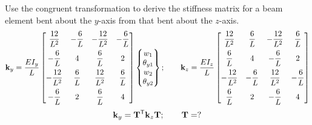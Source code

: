\begin{example}
Use the congruent transformation to derive the stiffness matrix for a beam element bent about the $y$-axis from that bent about the $z$-axis.
\begin{equation*}
  \mathbf{k}_y = \frac{EI_y}{L}
  \begin{bmatrix}
    \dfrac{12}{L^2} & -\dfrac6L & -\dfrac{12}{L^2} & -\dfrac6L\\[8pt]
    -\dfrac6L & 4 & \dfrac6L & 2\\[8pt]
    -\dfrac{12}{L^2} & \dfrac6L & \dfrac{12}{L^2} & \dfrac6L\\[8pt]
    -\dfrac6L & 2 & \dfrac6L & 4
  \end{bmatrix}\begin{Bmatrix}w_1\\ \theta_{y1}\\ w_2\\ \theta_{y2}\end{Bmatrix};\qquad
  \mathbf{k}_z = \frac{EI_z}{L}
  \begin{bmatrix}
    \dfrac{12}{L^2} & \dfrac6L & -\dfrac{12}{L^2} & \dfrac6L\\[8pt]
    \dfrac6L & 4 & -\dfrac6L & 2\\[8pt]
    -\dfrac{12}{L^2} & -\dfrac6L & \dfrac{12}{L^2} & -\dfrac6L\\[8pt]
    \dfrac6L & 2 & -\dfrac6L & 4
  \end{bmatrix}
\end{equation*}
\begin{equation*}
  \mathbf{k}_y = \mathbf{T}^{\mathsf{T}}\mathbf{k}_z\mathbf{T};\qquad \mathbf{T} = ?
\end{equation*}
\end{example}

